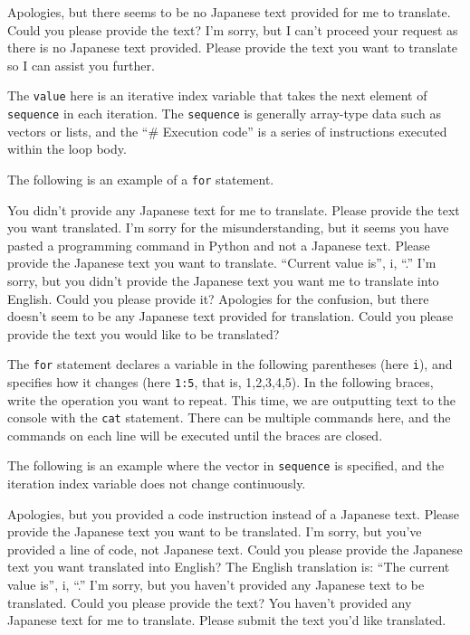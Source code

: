 \documentclass[
  a4paper,
]{book}
\begin{document}
Apologies, but there seems to be no Japanese text provided for me to
translate. Could you please provide the text? I'm sorry, but I can't
proceed your request as there is no Japanese text provided. Please
provide the text you want to translate so I can assist you further.

The \texttt{value} here is an iterative index variable that takes the
next element of \texttt{sequence} in each iteration. The
\texttt{sequence} is generally array-type data such as vectors or lists,
and the ``\# Execution code'' is a series of instructions executed
within the loop body.

The following is an example of a \texttt{for} statement.

You didn't provide any Japanese text for me to translate. Please provide
the text you want translated. I'm sorry for the misunderstanding, but it
seems you have pasted a programming command in Python and not a Japanese
text. Please provide the Japanese text you want to translate. ``Current
value is'', i, ``.\n'' I'm sorry, but you didn't provide the Japanese
text you want me to translate into English. Could you please provide it?
Apologies for the confusion, but there doesn't seem to be any Japanese
text provided for translation. Could you please provide the text you
would like to be translated?

The \texttt{for} statement declares a variable in the following
parentheses (here \texttt{i}), and specifies how it changes (here
\texttt{1:5}, that is, 1,2,3,4,5). In the following braces, write the
operation you want to repeat. This time, we are outputting text to the
console with the \texttt{cat} statement. There can be multiple commands
here, and the commands on each line will be executed until the braces
are closed.

The following is an example where the vector in \texttt{sequence} is
specified, and the iteration index variable does not change
continuously.

Apologies, but you provided a code instruction instead of a Japanese
text. Please provide the Japanese text you want to be translated. I'm
sorry, but you've provided a line of code, not Japanese text. Could you
please provide the Japanese text you want translated into English? The
English translation is: ``The current value is'', i, ``.\n'' I'm sorry,
but you haven't provided any Japanese text to be translated. Could you
please provide the text? You haven't provided any Japanese text for me
to translate. Please submit the text you'd like translated.
\end{document}
